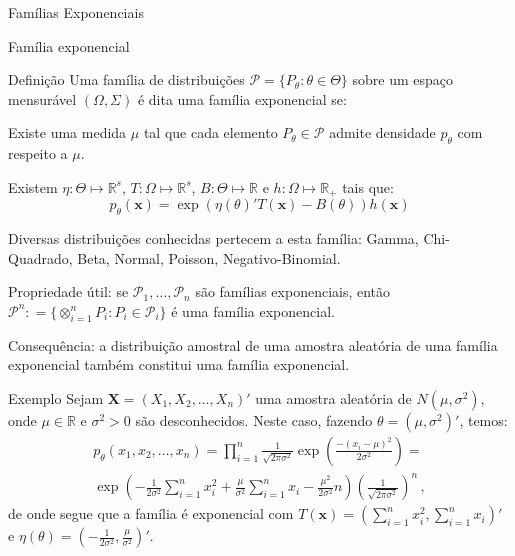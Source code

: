 \documentclass[11pt]{beamer}
\newenvironment{transitionframe}{
	\setbeamercolor{background canvas}{bg=yellow}
	\begin{frame}}{
	\end{frame}
}
\newenvironment{wideitemize}{\itemize\addtolength{\itemsep}{10pt}}{\enditemize}
\newenvironment{halfwideitemize}{\itemize\addtolength{\itemsep}{0.5em}}{\enditemize}
\newenvironment{halfwideenumerate}{\enumerate\addtolength{\itemsep}{0.5em}}{\endenumerate}
\begin{document}
	\begin{transitionframe}
		\centering 
		\Huge{Famílias Exponenciais}
	\end{transitionframe}
	\begin{frame}{Família exponencial}
		\begin{block}{Definição}
			Uma família de distribuições $\mathcal{P} = \{P_\theta : \theta \in \Theta\}$ sobre um espaço mensurável $(\Omega, \Sigma)$ é dita uma família exponencial se:
			\begin{halfwideenumerate}
				\item Existe uma medida $\mu$ tal que cada elemento $P_\theta \in \mathcal{P}$  admite densidade $p_\theta$ com respeito a $\mu$.
				\item Existem $\eta : {\Theta} \mapsto  \mathbb{R}^s$, $T: \Omega \mapsto \mathbb{R}^s$, $B: \Theta \mapsto \mathbb{R}$ e $h: \Omega \mapsto \mathbb{R}_+$ tais que:
				$$p_\theta(\boldsymbol{x}) = \exp(\eta(\theta)'T(\boldsymbol{x}) -B(\theta)) h(\boldsymbol{x})$$
			\end{halfwideenumerate}
		\end{block}
		\begin{halfwideitemize}
			\item Diversas distribuições conhecidas pertecem a esta família: Gamma, Chi-Quadrado, Beta, Normal, Poisson, Negativo-Binomial.
			\item Propriedade útil: se $\mathcal{P}_1,\ldots, \mathcal{P}_n$ são famílias exponenciais, então $\mathcal{P}^n : = \{\otimes_{i=1}^n P_i: P_i \in \mathcal{P}_i\}$ é uma família exponencial.
			\begin{wideitemize}
				\item Consequência: a distribuição amostral de uma amostra aleatória de uma família exponencial também constitui uma família exponencial.
			\end{wideitemize}
		\end{halfwideitemize}
	\end{frame}
	\begin{frame}{Exemplo}
		Sejam $\boldsymbol{X}= (X_1, X_2, \ldots, X_n)'$ uma amostra aleatória de $N(\mu, \sigma^2)$, onde $\mu \in \mathbb{R}$ e $\sigma^2 >0$ são desconhecidos. Neste caso, fazendo $\theta = (\mu, \sigma^2)'$, temos:
		\begin{equation}
			\begin{aligned}
				p_\theta(x_1,x_2,\ldots, x_n) = \prod_{i=1}^n \frac{1}{\sqrt{2\pi\sigma^2}}\exp\left(\frac{-(x_i-\mu)^2}{2\sigma^2}\right) =  \\ 
				\exp\left(-\frac{1}{2\sigma^2}\sum_{i=1}^n x_i^2 + \frac{\mu}{\sigma^2} \sum_{i=1}^n x_i - \frac{\mu^2}{2\sigma^2}n\right)\left(\frac{1}{\sqrt{2\pi\sigma^2}}\right)^n \, ,
			\end{aligned}
		\end{equation}
		de onde segue que a família é exponencial com $T(\boldsymbol{x}) = (\sum_{i=1}^n x_i^2, \sum_{i=1}^n x_i)'$ e ${\eta}(\theta) = \left(-\frac{1}{2\sigma^2}, \frac{\mu}{\sigma^2}\right)'$.
	\end{frame}
	
\end{document}
